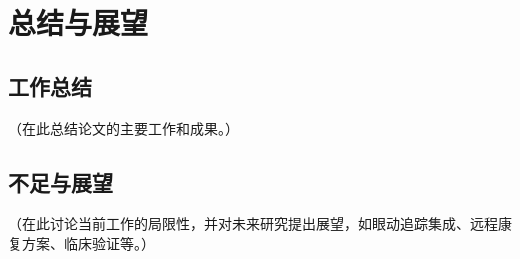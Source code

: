 \chapter{总结与展望}

\section{工作总结}
（在此总结论文的主要工作和成果。）

\section{不足与展望}
（在此讨论当前工作的局限性，并对未来研究提出展望，如眼动追踪集成、远程康复方案、临床验证等。）

